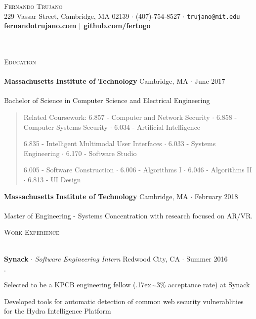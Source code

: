 \documentclass{article}
\newcommand{\area}[1]{\vspace*{-5pt} \begin{verse} #1 \end{verse} }
\newcommand{\lineunder}{\vspace*{-8pt} \\ \hspace*{-18pt} \hrulefill \\}
\newcommand{\header}[1]{{\hspace*{-10pt}\vspace*{9pt} {\large \textsc{#1}}} \vspace*{-5pt} \lineunder \vspace*{5pt}}
\newcommand{\employer}[4]{{ \textbf{#1} $\cdot$ \emph{#3} \hfill #4 $\cdot$ #2 }}
\newcommand{\contact}[3]{
\vspace*{-8pt}
\begin{center}
{\LARGE \scshape {#1}}\\
#2 $\cdot$ #3
\end{center}
\vspace*{-8pt}
}
\newenvironment{achievements}{\begin{list}{$\cdot$}{\topsep 0pt \itemsep -2pt}}{\vspace*{4pt}\end{list}}
\newcommand{\schoolwithcourses}[5]{\textbf{#1} \hfill #2 $\cdot$ #3\\#4\\#5\\\vspace*{3pt}}
\begin{document}
\small

\contact{Fernando Trujano}
{229 Vassar Street, Cambridge, MA 02139}
{(407)-754-8527 $\cdot$ \texttt{trujano@mit.edu}
\\{\bf\large{fernandotrujano.com $|$ github.com/fertogo}}}

  \\
  \\

\header{Education}
\schoolwithcourses{Massachusetts Institute of Technology}{Cambridge, MA}{June 2017 }{}{Bachelor of Science in Computer Science and Electrical Engineering}%
\area{
    Related Coursework:    6.857 - Computer and Network Security $\cdot$ 6.858 - Computer Systems Security  $\cdot$ 6.034 - Artificial Intelligence

    \hspace{85pt}
    6.835 - Intelligent Multimodal User Interfaces  $\cdot$ 6.033 - Systems Engineering $\cdot$ 6.170 - Software Studio

    \hspace{85pt}
    6.005 - Software Construction $\cdot$ 6.006 - Algorithms I $\cdot$ 6.046 - Algorithms II  $\cdot$ 6.813 - UI Design

}
\schoolwithcourses{Massachusetts Institute of Technology}{Cambridge, MA}{February 2018 }{}{Master of Engineering - Systems Concentration with research focused on AR/VR.}



\vspace{5pt} \header{Work Experience}

 \employer{Synack}{Summer 2016}{Software Engineering Intern}{Redwood City, CA}
    \begin{achievements}
                \item{Selected to be a KPCB engineering fellow ({\raise.17ex\hbox{$\scriptstyle\mathtt{\sim}$}}3\% acceptance rate) at Synack}
                \item{Developed tools for automatic detection of common web security vulnerablities for the Hydra Intelligence Platform}

    \end{achievements}
\end{document}
